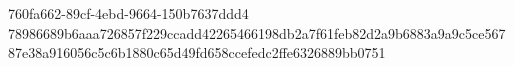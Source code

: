760fa662-89cf-4ebd-9664-150b7637ddd4
78986689b6aaa726857f229ccadd42265466198db2a7f61feb82d2a9b6883a9a9c5ce56787e38a916056c5c6b1880c65d49fd658ccefedc2ffe6326889bb0751
